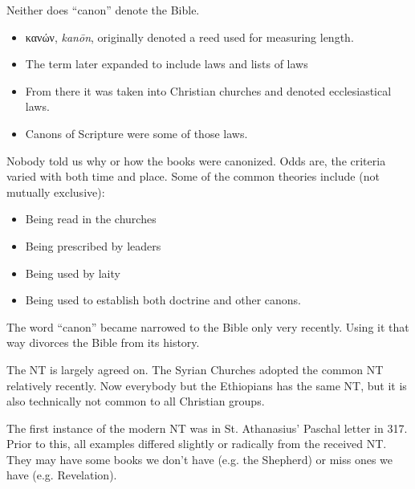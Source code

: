 \documentclass{beamer}
\begin{document}
\begin{frame}
  Neither does ``canon'' denote the Bible.\pause
  \begin{itemize}
	\item \textgreek{κανών}, \emph{kanōn}, originally denoted a reed used for measuring length. \pause
	\item The term later expanded to include laws and lists of laws\pause
	\item From there it was taken into Christian churches and denoted ecclesiastical laws.\pause
	\item Canons of Scripture were some of those laws.
  \end{itemize}
\end{frame}

\begin{frame}
  Nobody told us why or how the books were canonized.
  Odds are, the criteria varied with both time and place.
  Some of the common theories include (not mutually exclusive):\pause
  \begin{itemize}
	\item Being read in the churches\pause
	\item Being prescribed by leaders\pause
	\item Being used by laity\pause
	\item Being used to establish both doctrine and other canons.
  \end{itemize}
\end{frame}

\begin{frame}
  The word ``canon'' became narrowed to the Bible only very recently.
  Using it that way divorces the Bible from its history.
\end{frame}

\begin{frame}
  The NT is largely agreed on.
  The Syrian Churches adopted the common NT relatively recently.
  Now everybody but the Ethiopians has the same NT, but it is also technically not common to all Christian groups.
\end{frame}

\begin{frame}
  The first instance of the modern NT was in St. Athanasius' Paschal letter in 317.
  Prior to this, all examples differed slightly or radically from the received NT.
  They may have some books we don't have (e.g. the Shepherd) or miss ones we have (e.g. Revelation).
\end{frame}
\end{document}
